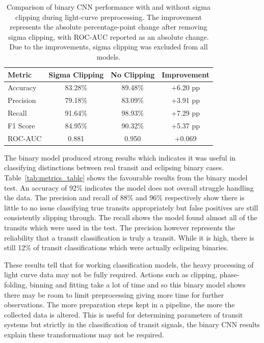 \begin{table}[H]
    \centering
    \begin{tabular}{lccc}
        \hline
        \textbf{Metric} & \textbf{Sigma Clipping} & \textbf{No Clipping} & \textbf{Improvement} \\
        \hline
        Accuracy  & 83.28\% & 89.48\% & +6.20 pp \\
        Precision & 79.18\% & 83.09\% & +3.91 pp \\
        Recall    & 91.64\% & 98.93\% & +7.29 pp \\
        F1 Score  & 84.95\% & 90.32\% & +5.37 pp \\
        ROC-AUC   & 0.881   & 0.950   & +0.069 \\
        \hline
    \end{tabular}
    \caption{Comparison of binary CNN performance with and without sigma clipping during light-curve preprocessing. The improvement represents the absolute percentage-point change after removing sigma clipping, with ROC-AUC reported as an absolute change. Due to the improvements, sigma clipping was excluded from all models.}
    \label{tab:clipping_comparison}
\end{table}

The binary model produced strong results which indicates it was useful in classifying distinctions between real transit and eclipsing binary cases. Table~\ref{tab:metrics_table} shows the favourable results from the binary model test. An accuracy of 92\% indicates the model does not overall struggle handling the data. The precision and recall of 88\% and 96\% respectively show there is little to no issue classifying true transits appropriately but false positives are still consistently slipping through. The recall shows the model found almost all of the transits which were used in the test. The precision however represents the reliability that a transit classification is truly a transit. While it is high, there is still 12\% of transit classifications which were actually eclipsing binaries. 

These results tell that for working classification models, the heavy processing of light curve data may not be fully required. Actions such as clipping, phase-folding, binning and fitting take a lot of time and so this binary model shows there may be room to limit preprocessing giving more time for further observations. The more preparation steps kept in a pipeline, the more the collected data is altered. This is useful for determining parameters of transit systems but strictly in the classification of transit signals, the binary CNN results explain these transformations may not be required.

